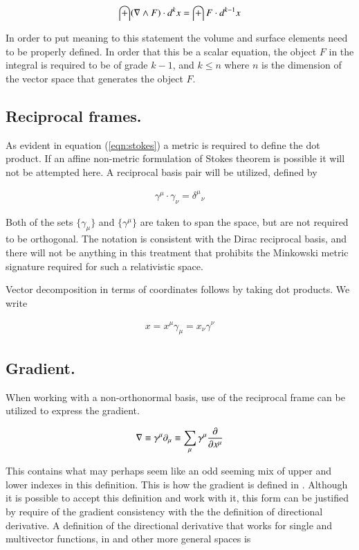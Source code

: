 \begin{align}\label{eqn:stokes}
\int (\nabla \wedge F) \cdot d^k x = \int F \cdot d^{k-1} x
\end{align}

In order to put meaning to this statement the volume and surface elements need to be properly defined.  In order that this be a scalar equation, the object $F$ in the integral is required to be of grade $k-1$, and $k \le n$ where $n$ is the dimension of the vector space that generates the object $F$.

\subsection{Reciprocal frames.}

As evident in equation (\ref{eqn:stokes}) a metric is required to define the dot product.  If an affine non-metric formulation
of Stokes theorem is possible it will not be attempted here.  A reciprocal basis pair will be utilized, defined by

\begin{align}
\gamma^\mu \cdot \gamma_\nu = {\delta^\mu}_\nu
\end{align}

Both of the sets $\{\gamma_\mu\}$ and $\{\gamma^\mu\}$ are taken to span the space, but are not required to be orthogonal.  The notation is consistent with the Dirac reciprocal basis, and there will not be anything in this treatment that prohibits the Minkowski metric signature required for such a relativistic space.

Vector decomposition in terms of coordinates follows by taking dot products.  We write

\begin{align}
x = x^\mu \gamma_\mu = x_\nu \gamma^\nu
\end{align}

\subsection{Gradient.}

When working with a non-orthonormal basis, use of the reciprocal frame can be utilized to express the gradient.

\begin{align}
\nabla \equiv \gamma^\mu \partial_\mu \equiv \sum_\mu \gamma^\mu \frac{\partial {}}{\partial {x^\mu}}
\end{align}

This contains what may perhaps seem like an odd seeming mix of upper and lower indexes in this definition.  This is how the gradient is defined in \cite{doran2003gap}.  Although it is possible to accept this definition and work with it, this form can be justified by require of the gradient consistency with the the definition of directional derivative.  A definition of the directional derivative that works for single and multivector functions, in  and other more general spaces is

